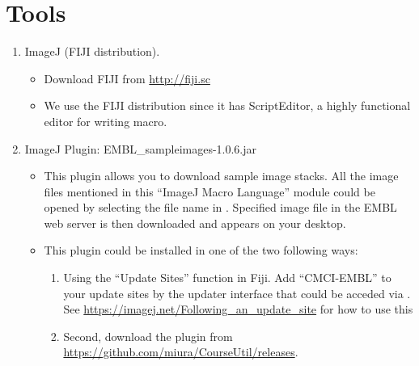 \section{Tools}
\label{sec:tools}

\begin{enumerate}
  \item ImageJ (FIJI distribution).

\begin{itemize}
    \item Download FIJI from \url{http://fiji.sc}
    \item We use the FIJI distribution since it has ScriptEditor, a highly functional editor for writing macro. 
  
\end{itemize}
  \item ImageJ Plugin: EMBL\_sampleimages-1.0.6.jar

\begin{itemize}
     \item This plugin allows you to download sample image stacks. All the image files mentioned in this ``ImageJ Macro Language'' module could be opened by selecting the file name in . Specified image file in the EMBL web server is then downloaded and appears on your desktop.
    \item This plugin could be installed in one of the two following ways:
    \begin{enumerate}
    \item Using the ``Update Sites'' function in Fiji. Add ``CMCI-EMBL'' to your update sites by the updater interface that could be acceded via . See \url{https://imagej.net/Following_an_update_site} for how to use this         
    \item Second, download the plugin from \url{https://github.com/miura/CourseUtil/releases}. 
    \end{enumerate}
\end{itemize}

\end{enumerate}
 
\newpage